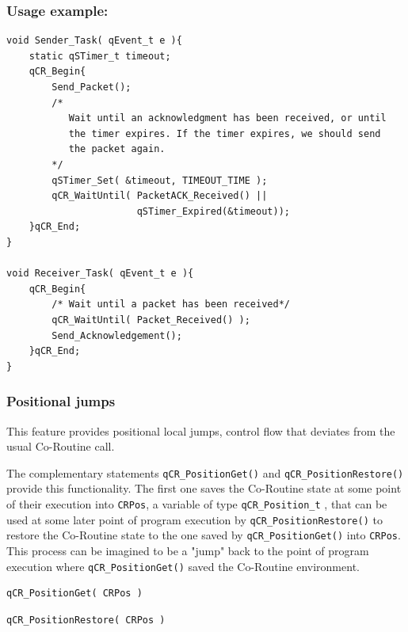 \documentclass{article}
\begin{document}
\subsubsection*{Usage example:}
\begin{lstlisting}[style=CStyle]
void Sender_Task( qEvent_t e ){
    static qSTimer_t timeout;
    qCR_Begin{                  
        Send_Packet();
        /* 
           Wait until an acknowledgment has been received, or until
           the timer expires. If the timer expires, we should send
           the packet again. 
        */
        qSTimer_Set( &timeout, TIMEOUT_TIME );
        qCR_WaitUntil( PacketACK_Received() || 
                       qSTimer_Expired(&timeout));
    }qCR_End;
}

void Receiver_Task( qEvent_t e ){
    qCR_Begin{                  
        /* Wait until a packet has been received*/
        qCR_WaitUntil( Packet_Received() );
        Send_Acknowledgement();  
    }qCR_End;
}
\end{lstlisting} 

\subsubsection{Positional jumps}
This feature provides positional local jumps, control flow that deviates from the usual Co-Routine call. 

The complementary statements \lstinline{qCR_PositionGet()}  and \lstinline{qCR_PositionRestore()}  provide this functionality.
The first one saves the Co-Routine state at some point of their execution into \lstinline{CRPos}, a variable of type \lstinline{qCR_Position_t} ,  that can be used at some later point of program execution by \lstinline{qCR_PositionRestore()} to restore the Co-Routine  state to the one saved by \lstinline{qCR_PositionGet()} into \lstinline{CRPos}. This process can be imagined to be a "jump" back to the point of program execution where \lstinline{qCR_PositionGet()} saved the Co-Routine  environment. \\

\begin{lstlisting}[style=CStyle]
qCR_PositionGet( CRPos )
\end{lstlisting}

\begin{lstlisting}[style=CStyle]
qCR_PositionRestore( CRPos )
\end{lstlisting}
\end{document}
